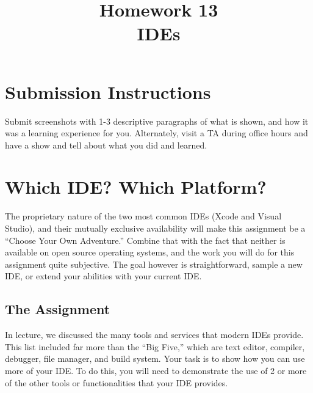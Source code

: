 \documentclass{article}
\begin{document}

\fancyfoot[C]{\color{gray} \thepage~/~\pageref*{LastPage}}
\pagestyle{fancyplain}


\title{\textbf{Homework 13\\IDEs}}
\date{\textbf{\color{red}{Due: Saturday, April 15, 10:00PM (Hard Deadline)}}}
\maketitle


\section*{Submission Instructions}
Submit screenshots with 1-3 descriptive paragraphs of what is shown, and how it
was a learning experience for you. Alternately, visit a TA during office hours
and have a show and tell about what you did and learned.

\section{Which IDE? Which Platform?}

The proprietary nature of the two most common IDEs (Xcode and Visual Studio), and their mutually exclusive availability will make this assignment be a
``Choose Your Own Adventure.'' Combine that with the fact that neither is
available on open source operating systems, and the work you will do for this
assignment quite subjective. The goal however is straightforward, sample a new
IDE, or extend your abilities with your current IDE.

\subsection*{The Assignment}
In lecture, we discussed the many tools and services that modern IDEs provide.
This list included far more than the ``Big Five,'' which are text editor,
compiler, debugger, file manager, and build system. Your task is to show how
you can use more of your IDE. To do this, you will need to demonstrate the use
of 2 or more of the other tools or functionalities that your IDE provides.
\end{document}
